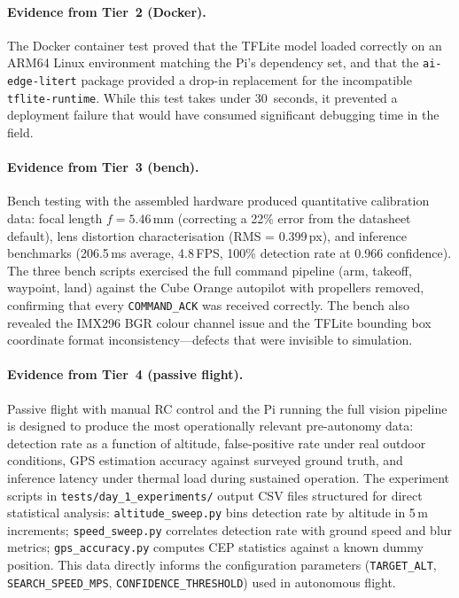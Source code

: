 \paragraph{Evidence from Tier~2 (Docker).}
The Docker container test proved that the TFLite model loaded correctly on an ARM64 Linux environment matching the Pi's dependency set, and that the \texttt{ai-edge-litert} package provided a drop-in replacement for the incompatible \texttt{tflite-runtime}.  While this test takes under 30~seconds, it prevented a deployment failure that would have consumed significant debugging time in the field.

\paragraph{Evidence from Tier~3 (bench).}
Bench testing with the assembled hardware produced quantitative calibration data: focal length $f = 5.46$\,mm (correcting a 22\% error from the datasheet default), lens distortion characterisation (RMS = 0.399\,px), and inference benchmarks (206.5\,ms average, 4.8\,FPS, 100\% detection rate at 0.966 confidence).  The three bench scripts exercised the full command pipeline (arm, takeoff, waypoint, land) against the Cube Orange autopilot with propellers removed, confirming that every \texttt{COMMAND\_ACK} was received correctly.  The bench also revealed the IMX296 BGR colour channel issue and the TFLite bounding box coordinate format inconsistency---defects that were invisible to simulation.

\paragraph{Evidence from Tier~4 (passive flight).}
Passive flight with manual RC control and the Pi running the full vision pipeline is designed to produce the most operationally relevant pre-autonomy data: detection rate as a function of altitude, false-positive rate under real outdoor conditions, GPS estimation accuracy against surveyed ground truth, and inference latency under thermal load during sustained operation.  The experiment scripts in \texttt{tests/day\_1\_experiments/} output CSV files structured for direct statistical analysis: \texttt{altitude\_sweep.py} bins detection rate by altitude in 5\,m increments; \texttt{speed\_sweep.py} correlates detection rate with ground speed and blur metrics; \texttt{gps\_accuracy.py} computes CEP statistics against a known dummy position.  This data directly informs the configuration parameters (\texttt{TARGET\_ALT}, \texttt{SEARCH\_SPEED\_MPS}, \texttt{CONFIDENCE\_THRESHOLD}) used in autonomous flight.

